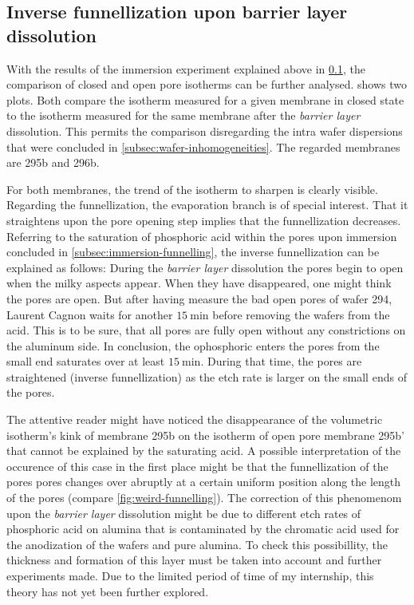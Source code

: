 \documentclass[../thesis.tex]{subfiles}
\begin{document}
          


        \subsection{Inverse funnellization upon barrier layer dissolution}
        \label{subsec:inverse-funnelling}

          With the results of the immersion experiment explained above in \cref{subsec:inverse-funnelling}, the comparison of closed and open pore isotherms can be further analysed.  shows two plots. Both compare the isotherm measured for a given membrane in closed state to the isotherm measured for the same membrane after the \textit{barrier layer} dissolution. This permits the comparison disregarding the intra wafer dispersions that were concluded in \cref{subsec:wafer-inhomogeneities}. The regarded membranes are 295b and 296b.

          

          For both membranes, the trend of the isotherm to sharpen is clearly visible. Regarding the funnellization, the evaporation branch is of special interest. That it straightens upon the pore opening step implies that the funnellization decreases. Referring to the saturation of phosphoric acid within the pores upon immersion concluded in \cref{subsec:immersion-funnelling}, the inverse funnellization can be explained as follows: During the \textit{barrier layer} dissolution the pores begin to open when the milky aspects appear. When they have disappeared, one might think the pores are open. But after having measure the bad open pores of wafer 294, Laurent Cagnon waits for another $\SI{15}{\minute}$ before removing the wafers from the acid. This is to be sure, that all pores are fully open without any constrictions on the aluminum side. In conclusion, the ophosphoric enters the pores from the small end saturates over at least $\SI{15}{\minute}$. During that time, the pores are straightened (inverse funnellization) as the etch rate is larger on the small ends of the pores.
          \medskip

          The attentive reader might have noticed the disappearance of the volumetric isotherm's kink of membrane 295b on the isotherm of open pore membrane 295b' that cannot be explained by the saturating acid. A possible interpretation of the occurence of this case in the first place might be that the funnellization of the pores pores changes over abruptly at a certain uniform position along the length of the pores (compare \cref{fig:weird-funnelling}). The correction of this phenomenom upon the \textit{barrier layer} dissolution might be due to different etch rates of phosphoric acid on alumina that is contaminated by the chromatic acid used for the anodization of the wafers and pure alumina. To check this possibillity, the thickness and formation of this layer must be taken into account and further experiments made. Due to the limited period of time of my internship, this theory has not yet been further explored.
\end{document}

